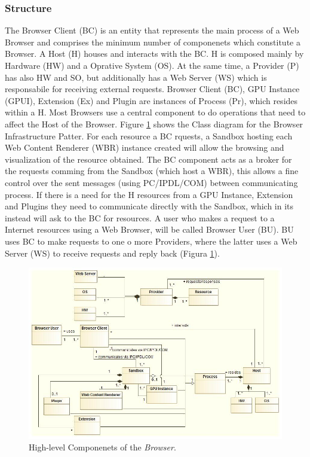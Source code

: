 \documentclass{sig-alternate-05-2015}
\begin{document}
    \subsubsection*{Structure}
    The Browser Client (BC) is an entity that represents the main process of a Web Browser and comprises the minimum number of componenets which constitute a Browser. A Host (H) houses and interacts with the BC. H is composed mainly by Hardware (HW) and a Oprative System (OS). At the same time, a Provider (P) has also HW and SO, but additionally has a Web Server (WS) which is responsabile for receiving external requests. Browser Client (BC), GPU Instance (GPUI), Extension (Ex) and Plugin are instances of Process (Pr), which resides within a H. Most Browsers use a central component to do operations that need to affect the Host of the Browser. Figure \ref{fig:BIPatt} shows the Class diagram for the Browser Infrastructure Patter. For each resource a BC rquests, a Sandbox hosting each Web Content Renderer (WBR) instance created will allow the browsing and visualization of the resource obtained. The BC component acts as a broker for the requests comming from the Sandbox (which host a WBR), this allows a fine control over the sent messages (using PC/IPDL/COM) between communicating process. If there is a need for the H resources from a GPU Instance, Extension and Plugins they need to communicate directly with the Sandbox, which in its instead will ask to the BC for resources. A user who makes a request to a Internet resources using a Web Browser, will be called Browser User (BU). BU uses BC to make requests to one o more Providers, where the latter uses a Web Server (WS) to receive requests and reply back (Figura \ref{fig:BIPatt}).

    \begin{figure}[h!t]
      \centering
      \includegraphics[scale=0.55]{figures/browserInfraPattern_v4.jpg}
      \caption{High-level Componenets of the \textit{Browser}.}
      \label{fig:BIPatt}
    \end{figure}
\end{document}
